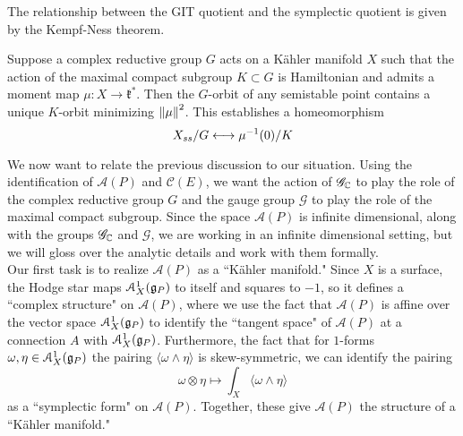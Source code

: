 %
The relationship between the GIT quotient and the symplectic quotient is
given by the Kempf-Ness theorem.
%
\begin{thm}
Suppose a complex reductive group $G$ acts on a K\"ahler manifold $X$
such that the action of the maximal compact subgroup $K \subset G$ is
Hamiltonian and admits a moment map $\mu : X \to \mathfrak{k}^*$. Then
the $G$-orbit of any semistable point contains a unique $K$-orbit minimizing
$\left\lVert\mu\right\rVert^2$. This establishes a homeomorphism
\[
X_{ss}/G \longleftrightarrow \mu^{-1}(0)/K
\]
\end{thm}
%
We now want to relate the previous discussion to our situation. Using
the identification of $\mathscr{A}(P)$ and $\mathscr{C}(E)$, we
want the action of $\mathscr{G}_{\mathbb{C}}$ to play the role of the complex reductive
group $G$ and the gauge group $\mathscr{G}$ to play the role of the maximal
compact subgroup. Since the space $\mathscr{A}(P)$ is infinite dimensional,
along with the groups $\mathscr{G}_{\mathbb{C}}$ and $\mathscr{G}$, we are working
in an infinite dimensional setting, but we will gloss over the analytic
details and work with them formally. \\

Our first task is to realize $\mathscr{A}(P)$ as a ``K\"ahler manifold."
Since $X$ is a surface, the Hodge star maps $\mathcal{A}^1_X(\mathfrak{g}_P)$ to
itself and squares to $-1$, so it defines a ``complex structure" on
$\mathscr{A}(P)$, where we use the fact that $\mathscr{A}(P)$ is affine
over the vector space $\mathcal{A}^1_X(\mathfrak{g}_P)$ to identify the ``tangent space"
of $\mathscr{A}(P)$ at a connection $A$ with $\mathcal{A}^1_X(\mathfrak{g}_P)$.
Furthermore, the fact that for $1$-forms $\omega,\eta \in \mathcal{A}^1_X(\mathfrak{g}_P)$
the pairing $\langle\omega\wedge\eta\rangle$ is skew-symmetric, we
can identify the pairing
\[
\omega \otimes \eta \mapsto \int_X \langle\omega\wedge\eta\rangle
\]
as a ``symplectic form" on $\mathscr{A}(P)$. Together, these give
$\mathscr{A}(P)$ the structure of a ``K\"ahler manifold." \\

